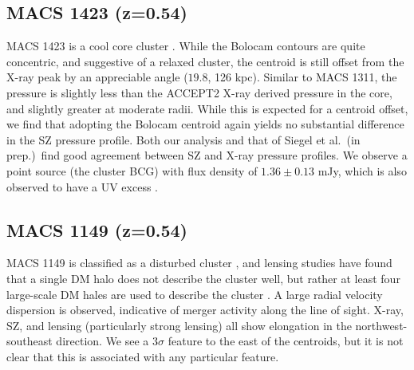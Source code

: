 \documentclass[iop,numberedappendix,apj]{emulateapj}
\begin{document}

\subsection{MACS 1423 (z=0.54)}
\label{sec:results_m1423}


MACS 1423 is a cool core cluster \citep{mann2012,sayers2013}. While the Bolocam contours are quite concentric,
and suggestive of a relaxed cluster, the centroid is still offset from the X-ray peak by an appreciable angle 
($19.8$\asec, 126 kpc). Similar to MACS 1311, the pressure is slightly less than the ACCEPT2 X-ray derived pressure in the
core, and slightly greater at moderate radii. While this is expected for a centroid offset, we find that adopting
the Bolocam centroid again yields no substantial difference in the SZ pressure profile. Both our analysis and
that of %
Siegel et al.\ (in prep.)\ find good agreement between SZ and X-ray pressure profiles. We observe a point source 
(the cluster BCG) with flux density of $1.36 \pm 0.13$ mJy, which is also observed to have a UV excess 
\citep{donahue2015}. 



\subsection{MACS 1149 (z=0.54)}
\label{sec:results_m1149}


MACS 1149 is classified as a disturbed cluster \citep[e.g.][]{mann2012,sayers2013}, and lensing studies have found
that a single DM halo does not describe the cluster well, but rather at least four large-scale DM hales are used to
describe the cluster \citep{smith2009}. A large radial velocity dispersion \citep[1800 km s$^{-1}$][]{ebeling2007} is 
observed, indicative of merger activity along the line of sight. X-ray, SZ, and lensing (particularly 
strong lensing) all show elongation in the northwest-southeast direction. We see a $3\sigma$ feature to the east of
the centroids, but it is not clear that this is associated with any particular feature.
\end{document}
